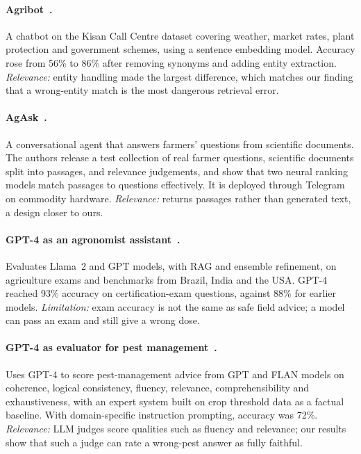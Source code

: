 \paragraph{Agribot~\cite{jain2025agribot}.}
A chatbot on the Kisan Call Centre dataset covering weather, market rates, plant protection
and government schemes, using a sentence embedding model. Accuracy rose from 56\% to 86\%
after removing synonyms and adding entity extraction. \emph{Relevance:} entity handling made
the largest difference, which matches our finding that a wrong-entity match is the most
dangerous retrieval error.

\paragraph{AgAsk~\cite{koopman2022agask}.}
A conversational agent that answers farmers' questions from scientific documents. The
authors release a test collection of real farmer questions, scientific documents split into
passages, and relevance judgements, and show that two neural ranking models match passages to
questions effectively. It is deployed through Telegram on commodity hardware.
\emph{Relevance:} returns passages rather than generated text, a design closer to ours.

\paragraph{GPT-4 as an agronomist assistant~\cite{silva2023gpt4agronomist}.}
Evaluates Llama~2 and GPT models, with RAG and ensemble refinement, on agriculture exams and
benchmarks from Brazil, India and the USA. GPT-4 reached 93\% accuracy on certification-exam
questions, against 88\% for earlier models. \emph{Limitation:} exam accuracy is not the same
as safe field advice; a model can pass an exam and still give a wrong dose.

\paragraph{GPT-4 as evaluator for pest management~\cite{yang2024gpt4evaluator}.}
Uses GPT-4 to score pest-management advice from GPT and FLAN models on coherence, logical
consistency, fluency, relevance, comprehensibility and exhaustiveness, with an expert system
built on crop threshold data as a factual baseline. With domain-specific instruction
prompting, accuracy was 72\%. \emph{Relevance:} LLM judges score qualities such as fluency
and relevance; our results show that such a judge can rate a wrong-pest answer as fully
faithful.

